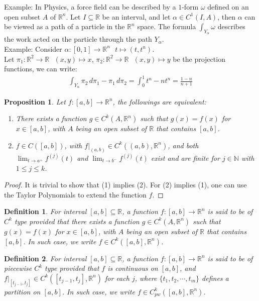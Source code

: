 \documentclass[11pt,oneside]{book}
\theoremstyle{break}
\theoremstyle{break}
\newtheorem{prop}[lem]{Proposition}
\newtheorem{defn}{Definition}[corL]
\newcommand{\R}{\mathbb{R}}
\newcommand{\N}{\mathbb{N}}
\newcommand{\example}{\color{green}Example: \color{black}}
\begin{document}
\example In Physics, a force field can be described by a $1$-form $\omega$ defined on an open subset $A$ of $\R^n$. Let $I\subseteq \R$ be an interval, and let $\alpha\in C^1(I,A)$, then $\alpha$ can be viewed as a path of a particle in the $\R^n$ space. The formula $\int_{Y_\alpha} \omega$ describes the work acted on the particle through the path $Y_\alpha$.\\

\example Consider $\alpha : [0,1]\to \R^n \ \ \ t\mapsto (t,t^n)$.\\ Let $\pi_1:\R^2 \to \R \ \ \ (x,y)\mapsto x$, $\pi_2:\R^2 \to \R \ \ \ (x,y)\mapsto y$ be the projection functions, we can write:
\begin{align*}
\int_{Y_\alpha} \pi_2\, d\pi_1 - \pi_1\, d\pi_2 = \int_0^1 t^n  - n t^{n} = \frac{1-n}{n+1}
\end{align*}

\begin{prop}
Let $f:[a,b]\to \R^n$, the followings are equivalent:
\begin{enumerate}[topsep=3pt,itemsep=-1ex,partopsep=1ex,parsep=1ex]
\item There exists a function $g\in C^k(A,\R^n)$ such that $g(x) = f(x)$ for $x\in [a,b]$, with $A$ being an open subset of $\R$ that contains $[a,b]$.
\item $f \in C([a,b])$, with $f|_{(a,b)} \in C^k((a,b),\R^n)$,  and both $\lim_{t \to a^+} f^{(j)}(t)$ and $\lim_{t \to b^-}f^{(j)}(t)$ exist and are finite for $j\in \N$ with $1\leq j \leq k$.
\end{enumerate}
\end{prop}
\begin{proof}
It is trivial to show that (1) implies (2). For (2) implies (1), one can use the Taylor Polynomials to extend the function $f$. 
\end{proof}

\begin{defn}
For interval $[a,b]\subseteq \R$, a function $f:[a,b] \to \R^n$ is said to be of $C^k$ type provided that there exists a function $g\in C^k(A,\R^n)$ such that $g(x) = f(x)$ for $x\in [a,b]$, with $A$ being an open subset of $\R$ that contains $[a,b]$. In such case, we write $f \in C^k([a,b],\R^n)$. 
\end{defn}

\begin{defn}
For interval $[a,b]\subseteq \R$, a function $f:[a,b] \to \R^n$ is said to be of piecewise $C^k$ type provided that $f$ is continuous on $[a,b]$, and $f|_{[t_{j-1},t_j]} \in C^k([t_{j-1},t_j],\R^n)$ for each $j$, where $\{t_1,t_2,\cdots, t_m\}$ defines a partition on $[a,b]$. In such case, we write $f \in C_{pw}^k([a,b],\R^n)$. 
\end{defn}
\end{document}
